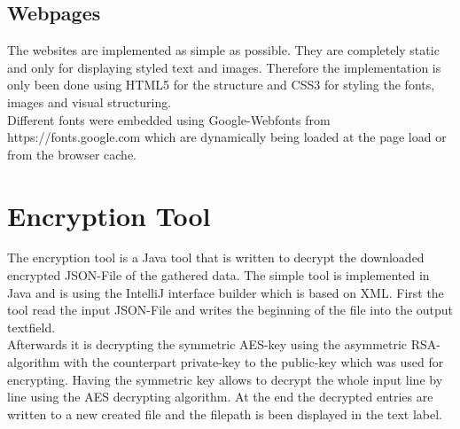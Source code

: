 \subsection{Webpages}
The websites are implemented as simple as possible. They are completely static and only for displaying styled text and images. Therefore the implementation is only been done using HTML5 for the structure and CSS3 for styling the fonts, images and visual structuring.\\
Different fonts were embedded using Google-Webfonts from https://fonts.google.com which are dynamically being loaded at the page load or from the browser cache. 

\section{Encryption Tool}
The encryption tool is a Java tool that is written to decrypt the downloaded encrypted JSON-File of the gathered data.
The simple tool is implemented in Java and is using the IntelliJ interface builder which is based on XML. 
First the tool read the input JSON-File and writes the beginning of the file into the output textfield.\\
Afterwards it is decrypting the symmetric AES-key using the asymmetric RSA-algorithm with the counterpart private-key to the public-key which was used for encrypting. Having the symmetric key allows to decrypt the whole input line by line using the AES decrypting algorithm.
At the end the decrypted entries are written to a new created file and the filepath is been displayed in the text label. 
